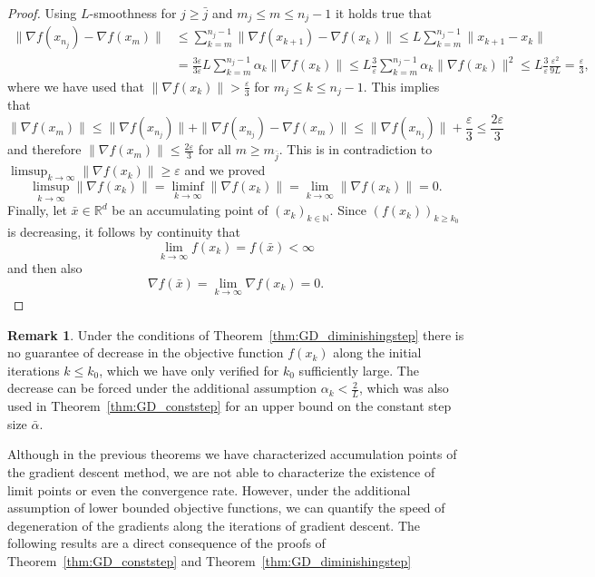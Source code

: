 \documentclass[12pt,openany]{book}
\theoremstyle{definition}
\newtheorem{remark}[thm]{Remark}
\theoremstyle{definition}
\newcommand{\N}{\mathbb{N}}
\newcommand{\R}{\mathbb{R}}
\begin{document}
\begin{proof}
Using $L$-smoothness for $j\ge \bar j$ and $m_j\le m  \le n_{j}-1$ it holds true that
\begin{align*}
\|\nabla f(x_{n_j})-\nabla f(x_m)\| &\le \sum_{k=m}^{n_j-1} \|\nabla f(x_{k+1})-\nabla f(x_k)\|\le L\sum_{k=m}^{n_j-1} \|x_{k+1}-x_k\|\\ &= \frac{3\varepsilon}{3\varepsilon} L \sum_{k=m}^{n_j-1} \alpha_k\|\nabla f(x_k)\|\le L\frac{3}{\varepsilon} \sum_{k=m}^{n_j-1}\alpha_k \|\nabla f(x_k)\|^2\le L\frac{3}{\varepsilon} \frac{\varepsilon^2}{9L} = \frac{\varepsilon}{3},
\end{align*}
where we have used that $\|\nabla f(x_k)\|> \frac{\varepsilon}{3}$ for $m_j \le k \le n_j-1$.  This implies that
\[\|\nabla f(x_m)\| \le \|\nabla f(x_{n_j})\| + \|\nabla f(x_{n_j})-\nabla f(x_m)\| \le \|\nabla f(x_{n_j})\| + \frac{\varepsilon}{3} \le \frac{2\varepsilon}{3}  \]
and therefore $\|\nabla f(x_m)\|\le \frac{2\varepsilon}{3}$ for all $m\ge m_{\bar j}$. This is in contradiction to $\limsup_{k\to\infty} \|\nabla f(x_k)\|\ge \varepsilon$ and we proved
\[\limsup_{k\to\infty} \|\nabla f(x_k)\| = \liminf_{k\to\infty} \|\nabla f(x_k)\| = \lim_{k\to\infty} \|\nabla f(x_k)\| = 0. \]
Finally, let $\bar x\in\R^d$ be an accumulating point of $(x_k)_{k\in\N}$. Since $(f(x_k))_{k\ge k_0}$ is decreasing, it follows by continuity that
\[\lim_{k\to\infty} f(x_k) = f(\bar x)<\infty \]
and then also
\[\nabla f(\bar x) = \lim_{k\to\infty} \nabla f(x_k) = 0. \]
\end{proof}

\begin{remark}
Under the conditions of Theorem~\ref{thm:GD_diminishingstep} there is no guarantee of decrease in the objective function $f(x_k)$ along the initial iterations $k\le k_0$, which we have only verified for $k_0$ sufficiently large.  The decrease can be forced under the additional assumption $\alpha_k < \frac{2}{L}$, which was also used in Theorem~\ref{thm:GD_conststep} for an upper bound on the constant step size $\bar \alpha$.
\end{remark}

Although in the previous theorems we have characterized accumulation points of the gradient descent method, we are not able to characterize the existence of limit points or even the convergence rate. However, under the additional assumption of lower bounded objective functions, we can quantify the speed of degeneration of the gradients along the iterations of gradient descent. The following results are a direct consequence of the proofs of Theorem~\ref{thm:GD_conststep} and Theorem~\ref{thm:GD_diminishingstep}
\end{document}
